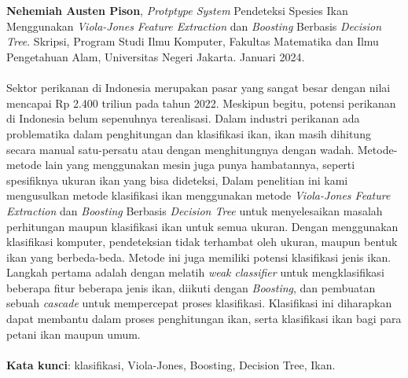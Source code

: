 \chapter*{}
\singlespacing{}

\textbf{Nehemiah Austen Pison}, \textit{Protptype System} Pendeteksi Spesies Ikan 
Menggunakan \textit{Viola-Jones Feature Extraction} dan \textit{Boosting} Berbasis 
\textit{Decision Tree}. Skripsi, Program Studi Ilmu Komputer, Fakultas Matematika dan Ilmu Pengetahuan Alam, Universitas Negeri Jakarta. Januari 2024.
\\
\\
Sektor perikanan di Indonesia merupakan pasar yang sangat besar dengan nilai 
mencapai Rp 2.400 triliun pada tahun 2022. Meskipun begitu, potensi perikanan 
di Indonesia belum sepenuhnya terealisasi. Dalam industri perikanan ada problematika 
dalam penghitungan dan klasifikasi ikan, ikan masih dihitung secara manual satu-persatu 
atau dengan menghitungnya dengan wadah. Metode-metode lain yang menggunakan mesin 
juga punya hambatannya, seperti spesifiknya ukuran ikan yang bisa dideteksi, Dalam 
penelitian ini kami mengusulkan metode klasifikasi ikan menggunakan metode \emph{Viola-Jones Feature Extraction} dan \textit{Boosting} Berbasis 
\emph{Decision Tree} untuk menyelesaikan masalah perhitungan maupun klasifikasi ikan 
untuk semua ukuran. Dengan menggunakan klasifikasi komputer, pendeteksian tidak terhambat 
oleh ukuran, maupun bentuk ikan yang berbeda-beda. Metode ini juga memiliki potensi 
klasifikasi jenis ikan. Langkah pertama adalah dengan melatih \emph{weak classifier} 
untuk mengklasifikasi beberapa fitur beberapa jenis ikan, diikuti dengan \emph{Boosting}, 
dan pembuatan sebuah \emph{cascade} untuk mempercepat proses klasifikasi. Klasifikasi 
ini diharapkan dapat membantu dalam proses penghitungan ikan, serta klasifikasi ikan 
bagi para petani ikan maupun umum.
\\
\\
\textbf{Kata kunci}: klasifikasi, Viola-Jones, Boosting, Decision Tree, Ikan.